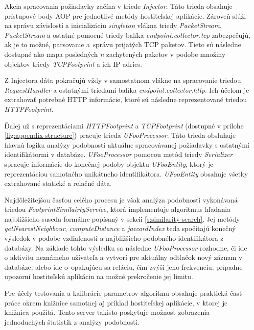 \documentclass[
  printed, %
  table,   %
  lof,     %
  nolot,   %
  nocover
]{fithesis3}
\begin{document}
Akcia spracovania požiadavky začína v triede \textit{Injector}. Táto trieda
obsahuje prístupové body AOP pre jednotlivé metódy hostiteľskej aplikácie.
Zároveň slúži na správu závislostí a inicializáciu \textit{singleton} vlákna
triedy \textit{PacketStream}. \textit{PacketStream} a ostatné pomocné triedy
balíka \textit{endpoint.collector.tcp} zabezpečujú, ak je to možné, parsovanie
a~správu prijatých TCP paketov. Tieto sú následne dostupné ako mapa posledných
\textit{n} zachytených paketov v podobe množiny objektov triedy \textit{TCPFootprint} a ich IP
adries.

Z Injectora dáta pokračujú vždy v samostatnom vlákne na spracovanie triedou
\textit{RequestHandler} a ostatnými triedami balíka
\textit{endpoint.collector.http}. Ich účelom je extrahovať potrebné HTTP
informácie, ktoré sú následne reprezentované triedou \textit{HTTPFootprint}.

Ďalej už s reprezentáciami \textit{HTTPFootprint} a \textit{TCPFootprint} (dostupné v prílohe \ref{fig:appendix-structure})
pracuje trieda \textit{UFooProcessor}. Táto trieda obsluhuje hlavnú logiku
analýzy podobnosti aktuálne spracovávanej požiadavky s ostatnými identifikátormi
v databáze. \textit{UFooProcessor} pomocou metód triedy \textit{Serializer} spracuje informácie do
konečnej podoby objektu \textit{UFooEntity}, ktorý je reprezentáciou samotného
unikátneho identifikátora. \textit{UFooEntity} obsahuje všetky extrahované
statické a relačné dáta.

Najdôležitejšou časťou celého procesu je však analýza podobnosti vykonávaná triedou
\textit{FootprintSimilairtyService}, ktorá implementuje algoritmus hľadania
najbližšieho suseda formálne popísaný v sekcii \ref{s:similarity-search}. Jej
metódy \textit{getNearestNeighbour},  \textit{computeDistance} a
\textit{jaccardIndex} teda spočítajú konečný výsledok v podobe vzdialenosti a
najbližšieho podobného identifikátora z databázy.
Na základe tohto výsledku sa následne \textit{UFooProcessor} rozhodne, či ide o
aktivitu neznámeho užívateľa a vytvorí pre aktuálny odtlačok nový záznam v
databáze, alebo ide o~opakujúcu sa reláciu, čím zvýši jeho frekvenciu, prípadne
upozorní hostiteľskú aplikáciu na možné prekročenie jej limitu.

Pre účely testovania a kalibrácie parametrov algoritmu obsahuje praktická časť práce okrem
knižnice samotnej aj príklad hostiteľskej aplikácie, v ktorej je knižnica
použitá. Tento server takisto poskytuje možnosť zobrazenia jednoduchých
štatistík z analýzy podobnosti.
\end{document}
